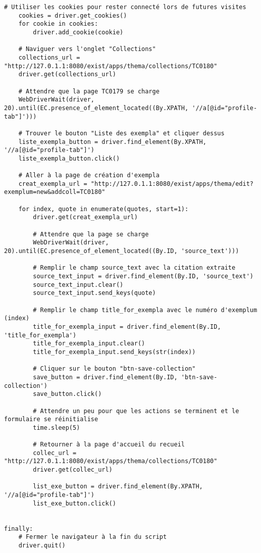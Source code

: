 \begin{lstlisting}[breaklines=true]
	# Utiliser les cookies pour rester connecté lors de futures visites
	cookies = driver.get_cookies()
	for cookie in cookies:
		driver.add_cookie(cookie)

	# Naviguer vers l'onglet "Collections"
	collections_url = "http://127.0.1.1:8080/exist/apps/thema/collections/TC0180"
	driver.get(collections_url)

	# Attendre que la page TC0179 se charge
	WebDriverWait(driver, 20).until(EC.presence_of_element_located((By.XPATH, '//a[@id="profile-tab"]')))

	# Trouver le bouton "Liste des exempla" et cliquer dessus
	liste_exempla_button = driver.find_element(By.XPATH, '//a[@id="profile-tab"]')
	liste_exempla_button.click()

	# Aller à la page de création d'exempla
	creat_exempla_url = "http://127.0.1.1:8080/exist/apps/thema/edit?exemplum=new&addcoll=TC0180"

	for index, quote in enumerate(quotes, start=1):
		driver.get(creat_exempla_url)

		# Attendre que la page se charge
		WebDriverWait(driver, 20).until(EC.presence_of_element_located((By.ID, 'source_text')))

		# Remplir le champ source_text avec la citation extraite
		source_text_input = driver.find_element(By.ID, 'source_text')
		source_text_input.clear()
		source_text_input.send_keys(quote)

		# Remplir le champ title_for_exempla avec le numéro d'exemplum (index)
		title_for_exempla_input = driver.find_element(By.ID, 'title_for_exempla')
		title_for_exempla_input.clear()
		title_for_exempla_input.send_keys(str(index))

		# Cliquer sur le bouton "btn-save-collection"
		save_button = driver.find_element(By.ID, 'btn-save-collection')
		save_button.click()

		# Attendre un peu pour que les actions se terminent et le formulaire se réinitialise
		time.sleep(5)

		# Retourner à la page d'accueil du recueil 
		collec_url = "http://127.0.1.1:8080/exist/apps/thema/collections/TC0180"
		driver.get(collec_url)

		list_exe_button = driver.find_element(By.XPATH, '//a[@id="profile-tab"]')
		list_exe_button.click()


finally:
	# Fermer le navigateur à la fin du script
	driver.quit()
	
\end{lstlisting}